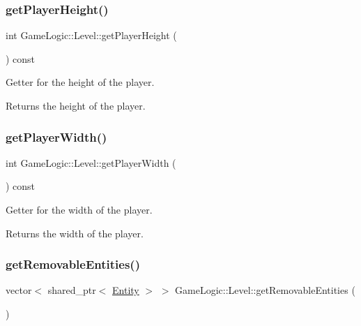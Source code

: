 \subsubsection{\texorpdfstring{get\+Player\+Height()}{getPlayerHeight()}}
{\footnotesize\ttfamily int Game\+Logic\+::\+Level\+::get\+Player\+Height (\begin{DoxyParamCaption}{ }\end{DoxyParamCaption}) const}

Getter for the height of the player. \begin{DoxyReturn}{Returns}
the height of the player. 
\end{DoxyReturn}
\mbox{\label{classGameLogic_1_1Level_a3e891e1ebca3e64b0fcf85ec6b50ee44}} 
\subsubsection{\texorpdfstring{get\+Player\+Width()}{getPlayerWidth()}}
{\footnotesize\ttfamily int Game\+Logic\+::\+Level\+::get\+Player\+Width (\begin{DoxyParamCaption}{ }\end{DoxyParamCaption}) const}

Getter for the width of the player. \begin{DoxyReturn}{Returns}
the width of the player. 
\end{DoxyReturn}
\mbox{\label{classGameLogic_1_1Level_aa6b01a37c08040974534c00031e8cbed}} 
\subsubsection{\texorpdfstring{get\+Removable\+Entities()}{getRemovableEntities()}}
{\footnotesize\ttfamily vector$<$ shared\+\_\+ptr$<$ \hyperlink{classGameLogic_1_1Entity}{Entity} $>$ $>$ Game\+Logic\+::\+Level\+::get\+Removable\+Entities (\begin{DoxyParamCaption}{ }\end{DoxyParamCaption})}

